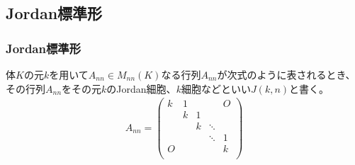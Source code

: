 \documentclass[dvipdfmx]{jsarticle}
\begin{document}
\subsection{Jordan標準形}%
\subsubsection{Jordan標準形}%
\begin{dfn*}
体$K$の元$k$を用いて$A_{nn} \in M_{nn}(K)$なる行列$A_{nn}$が次式のように表されるとき、その行列$A_{nn}$をその元$k$のJordan細胞、$k$細胞などといい$J(k,n)$と書く。
\begin{align*}
A_{nn} = \begin{pmatrix}
k & 1 & \  & \  & O \\
\  & k & 1 & \  & \  \\
\  & \  & k & \ddots & \  \\
\  & \  & \  & \ddots & 1 \\
O & \  & \  & \  & k \\
\end{pmatrix}
\end{align*}
\end{dfn*}
\end{document}
